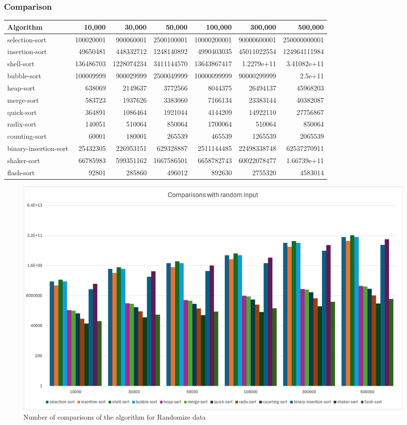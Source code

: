 \subsubsection{Comparison}
\begin{table}[h!]
\centering
\begin{tabular}{|l|r|r|r|r|r|r|}
\hline
\textbf{Algorithm} & \textbf{10,000} & \textbf{30,000} & \textbf{50,000} & \textbf{100,000} & \textbf{300,000} & \textbf{500,000} \\ \hline
selection-sort & 100020001 & 900060001 & 2500100001 & 10000200001 & 90000600001 & 250000000001 \\ \hline
insertion-sort & 49650481 & 448332712 & 1248140892 & 4990403035 & 45011022554 & 124964111984 \\ \hline
shell-sort & 136486703 & 1228074234 & 3411144570 & 13643867417 & 1.2279e+11 & 3.41082e+11 \\ \hline
bubble-sort & 100009999 & 900029999 & 2500049999 & 10000099999 & 90000299999 & 2.5e+11 \\ \hline
heap-sort & 638069 & 2149637 & 3772566 & 8044375 & 26494137 & 45968203 \\ \hline
merge-sort & 583723 & 1937626 & 3383060 & 7166134 & 23383144 & 40382087 \\ \hline
quick-sort & 364891 & 1086464 & 1921044 & 4144209 & 14922110 & 27756867 \\ \hline
radix-sort & 140051 & 510064 & 850064 & 1700064 & 510064 & 850064 \\ \hline
counting-sort & 60001 & 180001 & 265539 & 465539 & 1265539 & 2065539 \\ \hline
binary-insertion-sort & 25432305 & 226953151 & 629328887 & 2511144485 & 22498338748 & 62537270911 \\ \hline
shaker-sort & 66785983 & 599351162 & 1667586501 & 6658782743 & 60022078477 & 1.66739e+11 \\ \hline
flash-sort & 92801 & 285860 & 496012 & 892630 & 2755320 & 4583014 \\ \hline
\end{tabular}
\label{table:comparisons}
\end{table}

\begin{figure}[h]
    \centering
    \includegraphics[scale=0.65]{Figures/Visualization/Random_compare.png}
    \caption{Number of comparisons of the algorithm for Randomize data}
    \label{fig:enter-label}
\end{figure}

